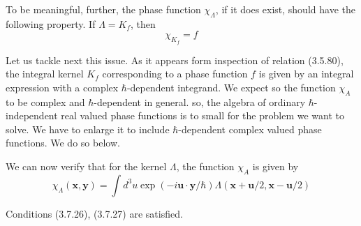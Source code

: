 \documentclass{article}
\begin{document}
To be meaningful, further, the phase function $\chi_{\Lambda}$, if it does exist, should have the following property. If $\Lambda=K_{f}$, then
$$
\begin{equation*}
\chi_{K_{f}}=f \tag{3.7.27}
\end{equation*}
$$

Let us tackle next this issue.
As it appears form inspection of relation (3.5.80), the integral kernel $K_{f}$ corresponding to a phase function $f$ is given by an integral expression with a complex $\hbar$-dependent integrand. We expect so the function $\chi_{A}$ to be complex and $\hbar$-dependent in general. so, the algebra of ordinary $\hbar$-independent real valued
phase functions is to small for the problem we want to solve. We have to enlarge it to include $\hbar$-dependent complex valued phase functions. We do so below.

We can now verify that for the kernel $\Lambda$, the function $\chi_{A}$ is given by
$$
\begin{equation*}
\chi_{\Lambda}(\boldsymbol{x}, \boldsymbol{y})=\int d^{3} u \exp (-i \boldsymbol{u} \cdot \boldsymbol{y} / \hbar) \Lambda(\boldsymbol{x}+\boldsymbol{u} / 2, \boldsymbol{x}-\boldsymbol{u} / 2) \tag{3.7.28}
\end{equation*}
$$

Conditions (3.7.26), (3.7.27) are satisfied.
\end{document}
